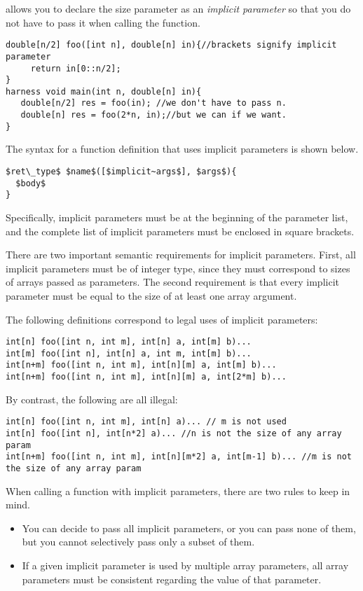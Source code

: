\Sk{} allows you to declare the size parameter  as an \emph{implicit parameter} so that you do not have to pass it when calling the function.

\begin{lstlisting}
double[n/2] foo([int n], double[n] in){//brackets signify implicit parameter
     return in[0::n/2];
}
harness void main(int n, double[n] in){
   double[n/2] res = foo(in); //we don't have to pass n.
   double[n] res = foo(2*n, in);//but we can if we want.
}
\end{lstlisting}

The syntax for a function definition that uses implicit parameters is shown below. 
\begin{lstlisting}
$ret\_type$ $name$([$implicit~args$], $args$){
  $body$
}
\end{lstlisting}
Specifically, implicit parameters must be at the beginning of the parameter list, and the complete list of implicit parameters must be enclosed in square brackets.

There are two important semantic requirements for implicit parameters. First, all implicit parameters must be of integer type, since they must correspond to sizes of arrays passed as parameters. The second requirement is that every implicit parameter must be equal to the size of at least one array argument.

\begin{Example}
The following definitions correspond to legal uses of implicit parameters:
\begin{lstlisting}
int[n] foo([int n, int m], int[n] a, int[m] b)...
int[m] foo([int n], int[n] a, int m, int[m] b)...
int[n+m] foo([int n, int m], int[n][m] a, int[m] b)...
int[n+m] foo([int n, int m], int[n][m] a, int[2*m] b)...
\end{lstlisting}
By contrast, the following are all illegal:
\begin{lstlisting}
int[n] foo([int n, int m], int[n] a)... // m is not used
int[n] foo([int n], int[n*2] a)... //n is not the size of any array param
int[n+m] foo([int n, int m], int[n][m*2] a, int[m-1] b)... //m is not the size of any array param
\end{lstlisting}
\end{Example}

When calling a function with implicit parameters, there are two rules to keep in mind.
\begin{itemize}
\item You can decide to pass all implicit parameters, or you can pass none of them, but you cannot selectively pass only a subset of them.
\item If a given implicit parameter is used by multiple array parameters, all array parameters must be consistent regarding the value of that parameter.
\end{itemize}

